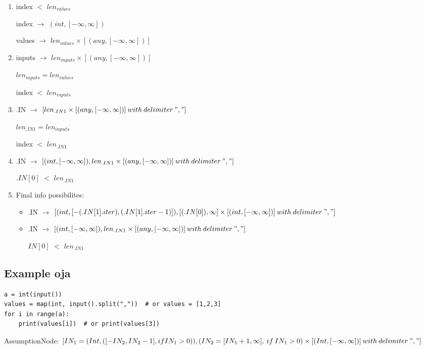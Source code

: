 \documentclass[11pt]{article}
\begin{document}
\begin{enumerate}
  \item index $<$ $len_{values}$

  index $\rightarrow$ $(int, [-\infty, \infty])$

  values $\rightarrow$ $len_{values}\times[(any, [-\infty, \infty])]$

  \item inputs $\rightarrow$ $len_{inputs}\times[(any, [-\infty, \infty])]$

  $len_{inputs} = len_{values}$

  index $<$ $len_{inputs}$

  \item .IN $\rightarrow$ $[len_{.IN1}\times[(any, [-\infty, \infty])]\:with\:delimiter\:","]$

  $len_{.IN1} = len_{inputs}$

  index $<$ $len_{.IN1}$

  \item .IN $\rightarrow$ $[(int, [-\infty, \infty]), len_{.IN1}\times[(any, [-\infty, \infty])]\:with\:delimiter\:","]$

  $.IN[0]$ $<$ $len_{.IN1}$

  \item Final info possibilites:

  \begin{itemize}
    \item .IN $\rightarrow$ $[(int, [-(.IN[1].iter), (.IN[1].iter-1)]), [(.IN[0]), \infty]\times[(int, [-\infty, \infty])]\:with\:delimiter\:","]$
    
    \item .IN $\rightarrow$ $[(int, [-\infty, \infty]), len_{.IN1}\times[(any, [-\infty, \infty])]\:with\:delimiter\:","]$
    
    $IN[0]$ $<$ $len_{.IN1}$
  \end{itemize}
  
\end{enumerate}


\subsection{Example oja}
\begin{lstlisting}
a = int(input())
values = map(int, input().split(","))  # or values = [1,2,3]
for i in range(a):
    print(values[i])  # or print(values[3])
\end{lstlisting}


AssumptionNode: $[IN_1 = (Int, ([-IN_2, IN_2-1], if IN_1 > 0)), (IN_2 = [IN_1+1, \infty],\:if\:IN_1 > 0) \times [(Int, [-\infty, \infty])]\:with\:delimiter\:","]$\\
\end{document}
